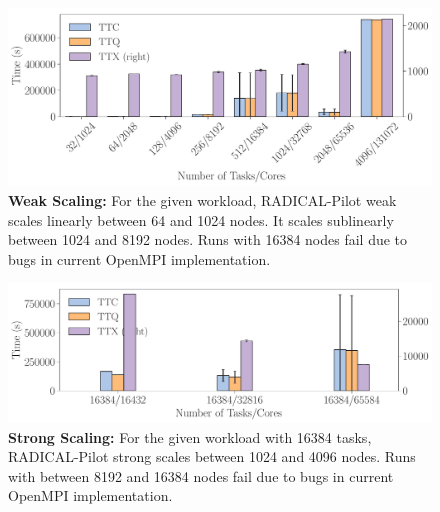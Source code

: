 \documentclass{article}
\begin{document}


\begin{figure}
  \centering
  \includegraphics[width=\columnwidth]{figures/paper_titan_rp_weak_scaling.pdf}
  \caption{\textbf{Weak Scaling:} For the given workload, RADICAL-Pilot weak scales
	linearly between 64 and 1024 nodes. It scales sublinearly between 1024
	and 8192 nodes. Runs with 16384 nodes fail due to bugs in current OpenMPI
	implementation. }\label{fig:ws-ttc}
\end{figure}

\begin{figure}
  \centering
  \includegraphics[width=\columnwidth]{figures/paper_titan_rp_synapse_strong_scaling.pdf}
  \caption{\textbf{Strong Scaling:} For the given workload with 16384 tasks,
	RADICAL-Pilot strong scales between 1024 and 4096 nodes. Runs with
	between 8192 and 16384 nodes fail  due to bugs in current OpenMPI
	implementation. }\label{fig:ss-ttc}
\end{figure}
\end{document}
